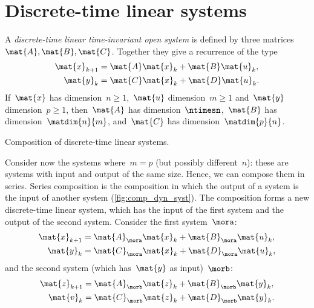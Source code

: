 
\section{Discrete-time linear systems}

\begin{definition}
    \label{def:discrete-time-linear-system}
    A \emph{discrete-time linear time-invariant open system} is defined by three matrices~$\mat{A},\mat{B},\mat{C}$.
    Together they give a recurrence of the type
    \begin{equation}
        \label{eq:discrete-time-dynamics}
        \begin{aligned}
            \mat{x}_{k+1} & =  \mat{A} \mat{x}_k + \mat{B} \mat{u}_k, \\
            \mat{y}_{k}   & =  \mat{C} \mat{x}_k + \mat{D} \mat{u}_k.
        \end{aligned}
    \end{equation}
    If~$\mat{x}$ has dimension~$n\geq1$,~$\mat{u}$ dimension~$m\geq1$ and~$\mat{y}$ dimension~$p\geq1$, then~$\mat{A}$ has dimension~$\ntimesn$,~$\mat{B}$ has dimension~$\matdim{n}{m}$, and~$\mat{C}$ has dimension~$\matdim{p}{n}$.
\end{definition}

\begin{marginfigure}
    \centering
    \caption{Composition of discrete-time linear systems.}
    \label{fig:comp_dyn_syst}
\end{marginfigure}

Consider now the systems where~$m=p$ (but possibly different~$n$):
these are systems with input and output of the same size.
Hence, we can compose them in series.
Series composition is the composition in which the output of a system is the input of another system (\cref{fig:comp_dyn_syst}).
The composition forms a new discrete-time linear system, which has the input of the first system and the output of the second system.
Consider the first system~$\mora$:
%
\begin{equation}
    \label{eq:dlin-1}
    \begin{aligned}
        \mat{x}_{k+1} & = \mat{A}_\mora \mat{x}_k + \mat{B}_\mora \mat{u}_k, \\
        \mat{y}_{k}   & = \mat{C}_\mora \mat{x}_k + \mat{D}_\mora \mat{u}_k,
    \end{aligned}
\end{equation}
%
and the second system (which has~$\mat{y}$ as input)~$\morb$:
%
\begin{equation}
    \label{eq:dlin-2}
    \begin{aligned}
        \mat{z}_{k+1} & = \mat{A}_\morb \mat{z}_k + \mat{B}_\morb \mat{y}_k, \\
        \mat{v}_{k}   & = \mat{C}_\morb \mat{z}_k+ \mat{D}_\morb \mat{y}_k.
    \end{aligned}
\end{equation}

